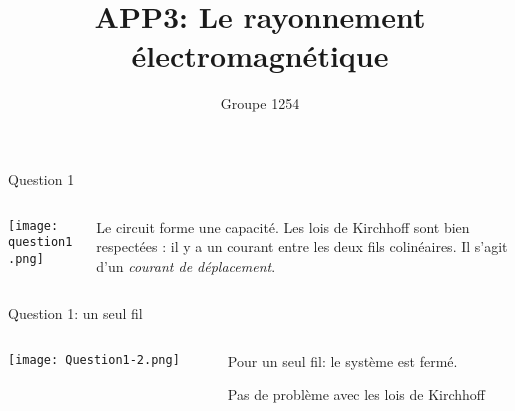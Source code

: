 \documentclass{beamer}
\title{APP3: Le rayonnement électromagnétique}
\author{Groupe 1254}
\begin{document}
\begin{frame}
	\maketitle
\end{frame}
\begin{frame}{Question 1}
	\begin{columns}
		\begin{column}{0.40\textwidth}
			\begin{center}
	    		\texttt{[image: question1.png]}
        		\end{center}
		\end{column}
		\begin{column}{0.40\textwidth}
		Le circuit forme une capacité.
		Les lois de Kirchhoff sont bien respectées : il y a un courant entre les deux fils colinéaires. Il s'agit 			d'un \emph{courant de déplacement}.
		\end{column}
	\end{columns}
\end{frame}
\begin{frame}{Question 1: un seul fil}
%
%        	
	\begin{columns}
		\begin{column}{0.40\textwidth}
			\begin{center}
	    		\texttt{[image: Question1-2.png]}
        		\end{center}
        	\end{column}
        	\begin{column}{0.40\textwidth}
			\begin{center}
	    Pour un seul fil: le système est fermé.
	    
	    Pas de problème avec les lois de Kirchhoff 
        	\end{center}
        	\end{column}
        	\end{columns}
\end{frame}
\end{document}
